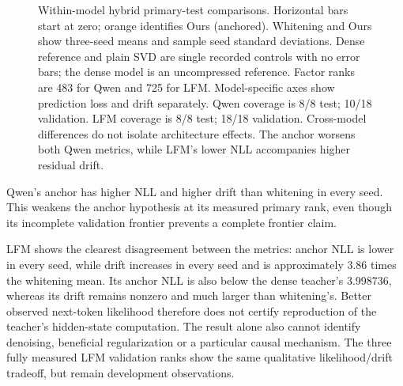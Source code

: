 \documentclass[conference]{IEEEtran}
\begin{document}
\begin{figure}[t]
\caption{Within-model hybrid primary-test comparisons. Horizontal bars start at
zero; orange identifies Ours (anchored). Whitening and Ours show three-seed means
and sample seed standard deviations. Dense reference and plain SVD are single
recorded controls with no error bars; the dense model is an uncompressed reference.
Factor ranks are 483 for Qwen and 725 for LFM. Model-specific axes show prediction
loss and drift separately. Qwen coverage is 8/8 test; 10/18 validation.
LFM coverage is 8/8 test; 18/18 validation. Cross-model differences do not isolate
architecture effects. The anchor worsens both Qwen metrics, while LFM's lower
NLL accompanies higher residual drift.}
\label{fig:hybrid-comparison}
\end{figure}
Qwen's anchor has higher NLL and higher drift than whitening in every seed. This weakens the anchor hypothesis at its measured primary rank, even though its incomplete validation frontier prevents a complete frontier claim.\par\smallskip
LFM shows the clearest disagreement between the metrics: anchor NLL is lower in every seed, while drift increases in every seed and is approximately 3.86 times the whitening mean. Its anchor NLL is also below the dense teacher's 3.998736, whereas its drift remains nonzero and much larger than whitening's. Better observed next-token likelihood therefore does not certify reproduction of the teacher's hidden-state computation. The result alone also cannot identify denoising, beneficial regularization or a particular causal mechanism. The three fully measured LFM validation ranks show the same qualitative likelihood/drift tradeoff, but remain development observations.\par\smallskip
\end{document}
